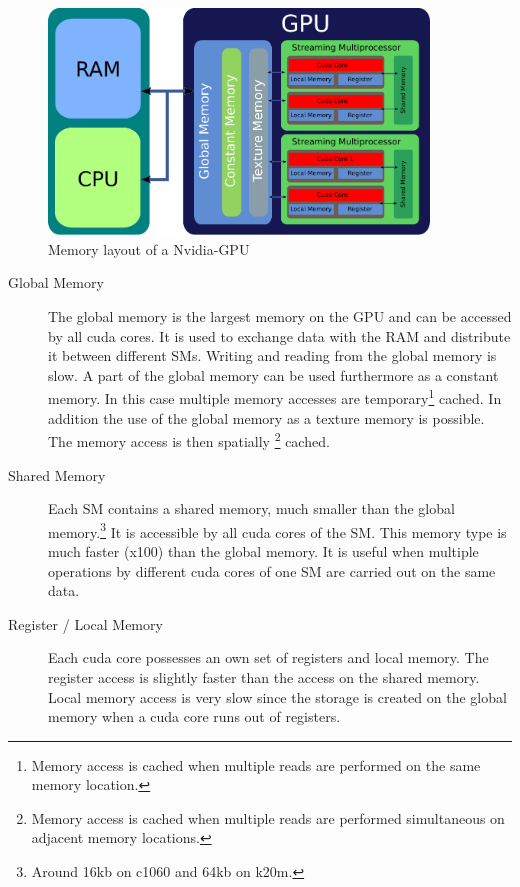 \begin{figure}[!tbp]
      \centering
        \includegraphics[width=0.9\textwidth]{gfx/cuda/gpu.pdf}
          \caption{Memory layout of a Nvidia-GPU}
    \label{fig:gpu_memory_layout}
\end{figure}

\begin{description}
    \item[Global Memory] The global memory is the largest memory on the GPU and can be accessed by all cuda cores.
                         It is  used to exchange data with the RAM and distribute it between different SMs.
                         Writing and reading from the global memory is slow. A part of the global memory can be used furthermore  as a constant memory.
                         In this case multiple memory accesses  are temporary\footnote{Memory access is cached when multiple reads are performed on the same memory location.}
                          cached.
                         In addition the use of the global memory as a texture memory is possible. The memory access is then spatially
                         \footnote{Memory access is cached when multiple reads are performed simultaneous on adjacent memory locations.} cached.

    \item[Shared Memory] Each SM contains a shared memory, much smaller than the global memory.\footnote{Around 16kb on c1060 and 64kb on k20m.} It is accessible
                         by all cuda cores of the SM.
                         This memory type is much faster (x100) than the global memory. It is useful when multiple operations
                         by different cuda cores of one SM are carried out on the same data.

    \item[Register / Local Memory] Each cuda core possesses an own set of registers and local memory.
                                   The register access is slightly faster than the access  on the shared memory.
                                   Local memory access is very slow since the storage is
                                    created on the global memory when a cuda core runs out of registers.
\end{description}

